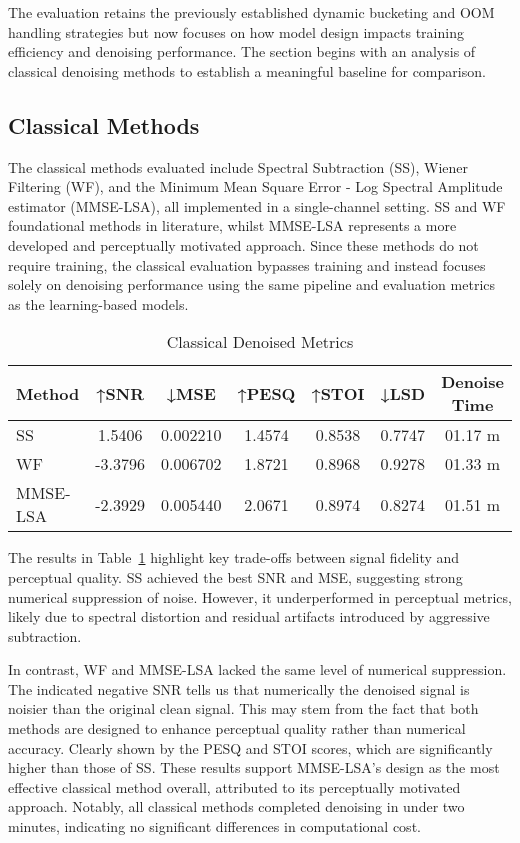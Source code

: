 The evaluation retains the previously established dynamic bucketing and OOM handling strategies but now focuses on how model design impacts training efficiency and denoising performance. The section begins with an analysis of classical denoising methods to establish a meaningful baseline for comparison.

\subsection{Classical Methods}
\label{sec:classical_methods}

The classical methods evaluated include Spectral Subtraction (SS), Wiener Filtering (WF), and the Minimum Mean Square Error - Log Spectral Amplitude estimator (MMSE-LSA), all implemented in a single-channel setting. SS and WF 
foundational methods in literature, whilst MMSE-LSA represents a more developed and perceptually motivated approach. Since these methods do not require training, the classical evaluation bypasses training and instead focuses solely on denoising performance using the same pipeline and evaluation metrics as the learning-based models.


\vspace{1em}
\begin{table}[H]
\centering
\caption{Classical Denoised Metrics}
\label{tab:classical_metrics}
\begin{tabular}{|l|c|c|c|c|c|c|}
\hline
\textbf{Method} & \textbf{↑SNR} & \textbf{↓MSE} & \textbf{↑PESQ} & \textbf{↑STOI} & \textbf{↓LSD} & \textbf{Denoise Time} \\
\hline
SS          & 1.5406 & 0.002210 & 1.4574 & 0.8538 & 0.7747 & 01.17 m \\
WF          & -3.3796 & 0.006702 & 1.8721 & 0.8968 & 0.9278 & 01.33 m \\
MMSE-LSA    & -2.3929 & 0.005440 & 2.0671 & 0.8974 & 0.8274 & 01.51 m \\
\hline
\end{tabular}
\end{table}


The results in Table~\ref{tab:classical_metrics} highlight key trade-offs between signal fidelity and perceptual quality. SS achieved the best SNR and MSE, suggesting strong numerical suppression of noise. However, it underperformed in perceptual metrics, likely due to spectral distortion and residual artifacts introduced by aggressive subtraction.

In contrast, WF and MMSE-LSA lacked the same level of numerical suppression. The indicated negative SNR tells us that numerically the denoised signal is noisier than the original clean signal. This may stem from the fact that both methods are designed to enhance perceptual quality rather than numerical accuracy. Clearly shown by the PESQ and STOI scores, which are significantly higher than those of SS. These results support MMSE-LSA's design as the most effective classical method overall, attributed to its perceptually motivated approach. Notably, all classical methods completed denoising in under two minutes, indicating no significant differences in computational cost.

